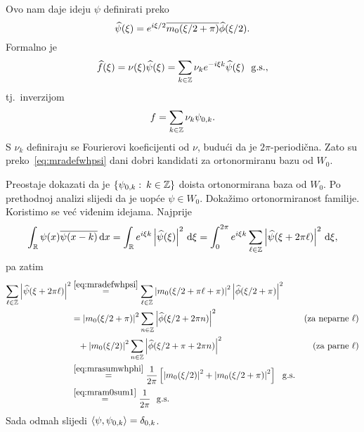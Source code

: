 \documentclass[main.tex]{subfiles}
\begin{document}
Ovo nam daje ideju \( \psi \) definirati preko
\begin{equation}\label{eq:mradefwhpsi}
	\widehat{\psi}(\xi) = e^{i\xi/2} \overline{m_0(\xi/2 + \pi)} \widehat{\phi}(\xi/2).
\end{equation}
Formalno je
\begin{equation}
	\widehat{f}(\xi) = \nu(\xi) \widehat{\psi}(\xi) = \sum_{k \in \mathbb{Z}} \nu_k e^{-i\xi k} \widehat{\psi}(\xi) \ \ \mathrm{g.s.},
\end{equation}
tj.\ inverzijom
\begin{equation}
	f = \sum_{k \in \mathbb{Z}} \nu_k \psi_{0,k}.
\end{equation}
S \( \nu_k \) definiraju se Fourierovi koeficijenti od \( \nu \),
budući da je \( 2\pi \)-periodična.
Zato su preko~\eqref{eq:mradefwhpsi} dani dobri
kandidati za ortonormiranu bazu od \( W_0 \).

Preostaje dokazati da je \( \left\{ \psi_{0,k} \, \colon \, k \in \mathbb{Z} \right\} \)
doista ortonormirana baza od \( W_0 \).
Po prethodnoj analizi slijedi da je uopće \( \psi \in W_0 \).
Dokažimo ortonormiranost familije.
Koristimo se već viđenim idejama. Najprije
\begin{align}
	\int_{\mathbb{R}} \psi(x) \overline{\psi(x-k)} \,\mathrm d x
	= \int_{\mathbb{R}} e^{i \xi k} \left| {\widehat{\psi}(\xi)} \right|^2 \,\mathrm d \xi
	= \int_0^{2\pi} e^{i\xi k} \sum_{\ell \in \mathbb{Z}} \left| {\widehat{\psi}(\xi + 2\pi\ell)} \right|^2 \,\mathrm d \xi,
\end{align}
pa zatim
\begin{align}
	\sum_{\ell \in \mathbb{Z}} \left| {\widehat{\psi}(\xi + 2\pi\ell)} \right|^2
	       & \stackrel{\scriptstyle {\eqref{eq:mradefwhpsi}}}{=}
	\sum_{\ell \in \mathbb{Z}} \left| {m_0(\xi/2 + \pi\ell + \pi)} \right|^2 \left| {\widehat{\phi}(\xi/2 + \pi)} \right|^2              \\
	       & = \left| {m_0(\xi/2 + \pi)} \right|^2 \sum_{n \in \mathbb{Z}} \left| {\widehat{\phi}(\xi/2 + 2\pi n)} \right|^2
	\qquad & (\text{za neparne } \ell)                                                               \\
	       & \phantom{=} + \left| {m_0(\xi/2)} \right|^2 \sum_{n \in \mathbb{Z}} \left| {\widehat{\phi}(\xi/2 + \pi + 2\pi n)} \right|^2
	\qquad & (\text{za parne } \ell)                                                                 \\
	       & \stackrel{\scriptstyle {\eqref{eq:mrasumwhphi}}}{=} \frac 1{2\pi}
	\left[ \left| {m_0(\xi/2)} \right|^2 + \left| {m_0(\xi/2 + \pi)} \right|^2 \right] \ \ \mathrm{g.s.}                             \\
	       & \stackrel{\scriptstyle {\eqref{eq:mram0sum1}}}{=}
	\frac 1{2\pi} \ \ \mathrm{g.s.}
\end{align}
Sada odmah slijedi \( \left\langle {\psi}, {\psi_{0,k}} \right\rangle = \delta_{0,k} \).
\end{document}
